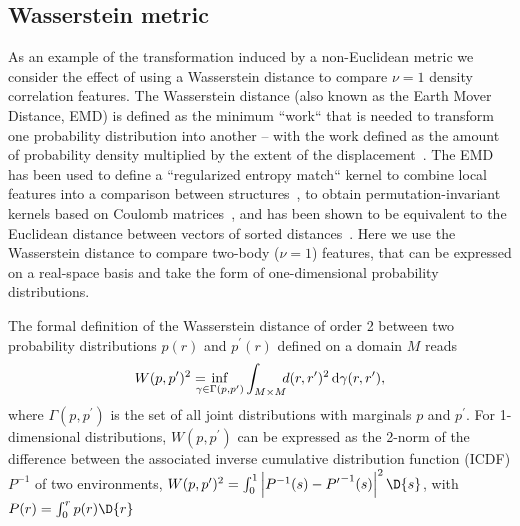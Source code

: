 \subsection{Wasserstein metric}
As an example of the transformation induced by a non-Euclidean metric we consider the effect of using a Wasserstein distance to compare $\nu=1$ density correlation features. 
The Wasserstein distance (also known as the Earth Mover Distance, EMD) is defined as the minimum  ``work`` that is needed to transform one probability distribution into another -- with the work defined as the amount of probability density multiplied by the extent of the displacement~\cite{vall74siam,cohe-guib97report,cutu07proc}.
The EMD has been used to define a ``regularized entropy match`` kernel to combine local features into a comparison between structures~\cite{de+16pccp}, to obtain permutation-invariant kernels based on Coulomb matrices~\cite{cayl+20mlst}, and  has been shown to be equivalent to the Euclidean distance between vectors of sorted distances~\cite{will+19jcp}.
Here we use the Wasserstein distance to compare two-body ($\nu=1$) features, that can be expressed on a real-space basis and take the form of one-dimensional probability distributions. 

The formal definition of the Wasserstein distance of order 2 between two probability distributions $p(r)$ and $p^{\prime}(r)$ defined on a domain $M$ reads
\begin{equation}
W(p,p^{\prime})^2 = \hspace{-1em}\inf_{\gamma\in\Gamma (p,p^{\prime})} \int_{M\times M}\hspace{-0.5em}d(r,r^{\prime})^2\,\mathrm{d}\gamma(r,r^{\prime}),
%
\end{equation}
where $\Gamma(p,p^{\prime})$ is the set of all joint distributions with marginals $p$ and $p^{\prime}$.
For 1-dimensional distributions, $W(p,p^{\prime})$ can be expressed as the 2-norm of the difference between the associated inverse cumulative distribution function (ICDF) $P^{-1}$ of two environments,
$W(p,p^{\prime})^2=\int_0^1  \left|P^{-1}(s) -{P^{\prime}}^{-1}(s)\right|^2\D{s}$, with $P(r)=\int_0^r p(r)\D{r}$ 


